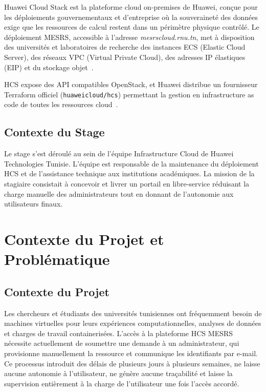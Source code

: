 Huawei Cloud Stack est la plateforme cloud on-premises de Huawei, conçue pour les
déploiements gouvernementaux et d'entreprise où la souveraineté des données exige que
les ressources de calcul restent dans un périmètre physique contrôlé. Le déploiement
MESRS, accessible à l'adresse \textit{mesrscloud.rnu.tn}, met à disposition des
universités et laboratoires de recherche des instances ECS (Elastic Cloud Server), des
réseaux VPC (Virtual Private Cloud), des adresses IP élastiques (EIP) et du stockage
objet~\cite{hcs_docs}.

HCS expose des API compatibles OpenStack, et Huawei distribue un fournisseur Terraform
officiel (\texttt{huaweicloud/hcs}) permettant la gestion en infrastructure as code
de toutes les ressources cloud~\cite{hcs_terraform_provider}.

\subsection{Contexte du Stage}

Le stage s'est déroulé au sein de l'équipe Infrastructure Cloud de Huawei Technologies
Tunisie. L'équipe est responsable de la maintenance du déploiement HCS et de
l'assistance technique aux institutions académiques. La mission de la stagiaire
consistait à concevoir et livrer un portail en libre-service réduisant la charge
manuelle des administrateurs tout en donnant de l'autonomie aux utilisateurs finaux.

\section{Contexte du Projet et Problématique}

\subsection{Contexte du Projet}

Les chercheurs et étudiants des universités tunisiennes ont fréquemment besoin de
machines virtuelles pour leurs expériences computationnelles, analyses de données et
charges de travail containerisées. L'accès à la plateforme HCS MESRS nécessite
actuellement de soumettre une demande à un administrateur, qui provisionne
manuellement la ressource et communique les identifiants par e-mail. Ce processus
introduit des délais de plusieurs jours à plusieurs semaines, ne laisse aucune
autonomie à l'utilisateur, ne génère aucune traçabilité et laisse la supervision
entièrement à la charge de l'utilisateur une fois l'accès accordé.

